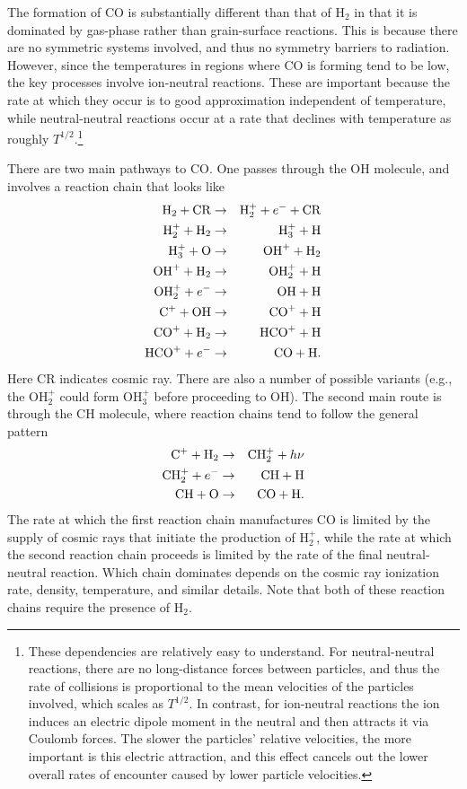 The formation of CO is substantially different than that of H$_2$ in that it is dominated by gas-phase rather than grain-surface reactions. This is because there are no symmetric systems involved, and thus no symmetry barriers to radiation. However, since the temperatures in regions where CO is forming tend to be low, the key processes involve ion-neutral reactions. These are important because the rate at which they occur is to good approximation independent of temperature, while neutral-neutral reactions occur at a rate that declines with temperature as roughly $T^{1/2}$.\footnote{These dependencies are relatively easy to understand. For neutral-neutral reactions, there are no long-distance forces between particles, and thus the rate of collisions is proportional to the mean velocities of the particles involved, which scales as $T^{1/2}$. In contrast, for ion-neutral reactions the ion induces an electric dipole moment in the neutral and then attracts it via Coulomb forces. The slower the particles' relative velocities, the more important is this electric attraction, and this effect cancels out the lower overall rates of encounter caused by lower particle velocities.}

There are two main pathways to CO. One passes through the OH molecule, and involves a reaction chain that looks like
\begin{eqnarray}
{\rm H}_2 + {\rm CR} & \rightarrow & {\rm H}_2^+ + e^{-} + {\rm CR} \\
{\rm H}_2^+ + {\rm H}_2 & \rightarrow & {\rm H}_3^+ + {\rm H} \\
{\rm H}_3^+ + {\rm O} & \rightarrow & {\rm OH}^+ + {\rm H}_2 \\
{\rm OH}^+ + {\rm H}_2 & \rightarrow & {\rm OH}_2^+ + {\rm H} \\
{\rm OH}_2^+ + e^{-} & \rightarrow & {\rm OH} + {\rm H} \\
{\rm C}^+ + {\rm OH} & \rightarrow & {\rm CO}^+ + {\rm H} \\
{\rm CO}^+ + {\rm H}_2 & \rightarrow & {\rm HCO}^+ + {\rm H} \\
{\rm HCO}^+ + e^{-} & \rightarrow & {\rm CO} + {\rm H}.
\end{eqnarray}
Here CR indicates cosmic ray. There are also a number of possible variants (e.g., the OH$_2^+$ could form OH$_3^+$ before proceeding to OH). The second main route is through the CH molecule, where reaction chains tend to follow the general pattern
\begin{eqnarray}
{\rm C}^+ + {\rm H}_2 & \rightarrow & {\rm CH}_2^+ + h\nu \\
{\rm CH}_2^+ + e^{-} & \rightarrow & {\rm CH} + {\rm H} \\
{\rm CH} + {\rm O} & \rightarrow & {\rm CO} + {\rm H}.
\end{eqnarray}
The rate at which the first reaction chain manufactures CO is limited by the supply of cosmic rays that initiate the production of H$_2^+$, while the rate at which the second reaction chain proceeds is limited by the rate of the final neutral-neutral reaction. Which chain dominates depends on the cosmic ray ionization rate, density, temperature, and similar details. Note that both of these reaction chains require the presence of H$_2$. 

